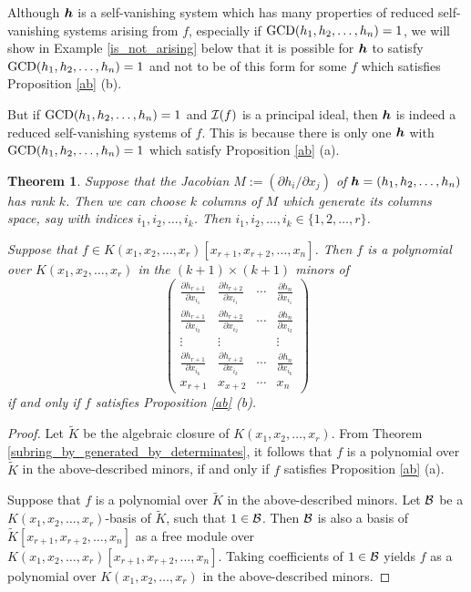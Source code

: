 \documentclass[12pt]{article}
\newtheorem{theorem}{Theorem}[section]
\theoremstyle{definition}
\theoremstyle{remark}
\def\cB{{\cal B}}
\def\cI{{\cal I}}
\def\boldh{\mbox{\boldmath $h$}}
\def\pa{\partial}
\def\parder#1#2{\frac{\pa #1}{\pa #2}}
\begin{document}
Although $\boldh$ is a self-vanishing system which has many properties of 
reduced self-vanishing systems arising from $f$, especially if 
${\rm GCD}(h_1,h_2,\ldots,h_n) = 1$, we will show in Example \ref{is_not_arising} 
below that it is possible for $\boldh$ to satisfy ${\rm GCD}(h_1,h_2,\ldots,h_n) = 1$
and not to be of this form for some $f$ which satisfies Proposition \ref{ab} (b).

But if ${\rm GCD}(h_1,h_2,\ldots,h_n) = 1$ and $\cI(f)$ is a principal ideal, 
then $\boldh$ is indeed a reduced self-vanishing systems of $f$. This is because
there is only one $\boldh$ with ${\rm GCD}(h_1,h_2,\ldots,h_n) = 1$ which 
satisfy Proposition \ref{ab} (a).

\begin{theorem} \label{thm92}
Suppose that the Jacobian $M := (\pa h_i/\pa x_j)$ of $\boldh = (h_1,h_2,\ldots,h_n)$
has rank $k$. Then we can choose $k$ columns of $M$ which generate its columns space,
say with indices $i_1, i_2, \ldots, i_k$. Then $i_1, i_2, \ldots, i_k \in \{1,2,\ldots,r\}$. 

Suppose that $f \in K(x_1,x_2,\ldots,x_r)[x_{r+1},x_{r+2},\ldots,x_n]$.
Then $f$ is a polynomial over $K(x_1,x_2,\ldots,x_r)$ in the $(k+1) \times (k+1)$
minors of 
$$
\left( \begin{array}{cccc}
\parder{h_{r+1}}{x_{i_1}} & \parder{h_{r+2}}{x_{i_1}} & \cdots & \parder{h_n}{x_{i_1}} \\[5pt]
\parder{h_{r+1}}{x_{i_2}} & \parder{h_{r+2}}{x_{i_2}} & \cdots & \parder{h_n}{x_{i_2}} \\[2pt]
\vdots & \vdots & & \vdots \\[2pt]
\parder{h_{r+1}}{x_{i_k}} & \parder{h_{r+2}}{x_{i_k}} & \cdots & \parder{h_n}{x_{i_k}} \\[5pt]
\hline
x_{r+1} & x_{x+2} & \cdots & x_n
\end{array} \right)
$$
if and only if $f$ satisfies Proposition \ref{ab} (b). 
\end{theorem}

\begin{proof}
Let $\tilde{K}$ be the algebraic closure of $K(x_1,x_2,\ldots,x_r)$.
From Theorem \ref{subring_by_generated_by_determinates}, it follows that 
$f$ is a polynomial over $\tilde{K}$ in the above-described minors, 
if and only if $f$ satisfies Proposition \ref{ab} (a). 

Suppose that $f$ is a polynomial over $\tilde{K}$ in the above-described 
minors. Let $\cB$ be a $K(x_1,x_2,\ldots,x_r)$-basis of $\tilde{K}$, 
such that $1 \in \cB$.  Then $\cB$ is also a basis of 
$\tilde{K}[x_{r+1},x_{r+2},\ldots,x_n]$ as a free module over 
$K(x_1,x_2,\ldots,x_r)[x_{r+1},x_{r+2},\ldots,x_n]$. Taking
coefficients of $1 \in \cB$ yields $f$ as a polynomial over 
$K(x_1,x_2,\allowbreak\ldots,x_r)$ in the above-described minors. 
\end{proof}
\end{document}

